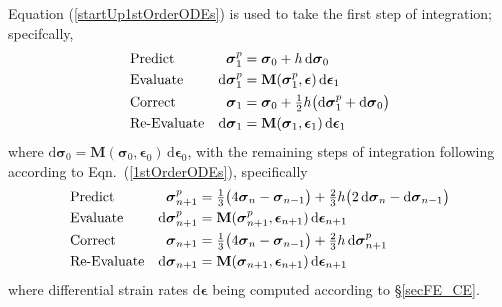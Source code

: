 Equation (\ref{startUp1stOrderODEs}) is used to take the first step of integration; specifcally, 
\begin{subequations}
    \notag
    \begin{align}
    \mbox{} & \text{Predict} & 
    \boldsymbol{\sigma}_1^p & = \boldsymbol{\sigma}_0 + h \, \mathrm{d} \boldsymbol{\sigma}_0 \\
    \mbox{} & \text{Evaluate} & 
    \mathrm{d} \boldsymbol{\sigma}^p_1 & = \mathbf{M} ( \boldsymbol{\sigma}_1^p ,
    \boldsymbol{\epsilon} ) \, \mathrm{d} \boldsymbol{\epsilon}_1 \\
    \mbox{} & \text{Correct} &
    \boldsymbol{\sigma}_1 & = \boldsymbol{\sigma}_0 + \tfrac{1}{2} h 
    \bigl( \mathrm{d} \boldsymbol{\sigma}_1^p + 
    \mathrm{d} \boldsymbol{\sigma}_0 \bigr) \\
    \mbox{} & \text{Re-Evaluate} & 
    \mathrm{d} \boldsymbol{\sigma}_1 & = \mathbf{M} ( \boldsymbol{\sigma}_1 , 
    \boldsymbol{\epsilon}_1) \, \mathrm{d} \boldsymbol{\epsilon}_1
    \end{align}
\end{subequations}
where $\mathrm{d} \boldsymbol{\sigma}_0 = \mathbf{M} ( \boldsymbol{\sigma}_0 , \boldsymbol{\epsilon}_0) \, \mathrm{d} \boldsymbol{\epsilon}_0$, with the remaining steps of integration following according to Eqn.~(\ref{1stOrderODEs}), specifically
\begin{subequations}
    \notag
    \begin{align}
    \mbox{} & \text{Predict} & 
    \boldsymbol{\sigma}_{n+1}^p & = \tfrac{1}{3} 
    \bigl( 4 \boldsymbol{\sigma}_n - \boldsymbol{\sigma}_{n-1} \bigr) + 
    \tfrac{2}{3} h \bigl( 2 \, \mathrm{d} \boldsymbol{\sigma}_n - 
    \mathrm{d} \boldsymbol{\sigma}_{n-1} \bigr) \\
    \mbox{} & \text{Evaluate} & 
    \mathrm{d} \boldsymbol{\sigma}^p_{n+1} & = \mathbf{M} ( \boldsymbol{\sigma}_{n+1}^p , \boldsymbol{\epsilon}_{n+1} ) \, 
    \mathrm{d} \boldsymbol{\epsilon}_{n+1} \\
    \mbox{} & \text{Correct} &
    \boldsymbol{\sigma}_{n+1} & = \tfrac{1}{3} 
    \bigl( 4 \boldsymbol{\sigma}_n - \boldsymbol{\sigma}_{n-1} \bigr) + 
    \tfrac{2}{3} h \, \mathrm{d} \boldsymbol{\sigma}^{p}_{n+1}  \\
    \mbox{} & \text{Re-Evaluate} & 
    \mathrm{d} \boldsymbol{\sigma}_{n+1} & = \mathbf{M} ( 
    \boldsymbol{\sigma}_{n+1} , \boldsymbol{\epsilon}_{n+1} )  \,
    \mathrm{d} \boldsymbol{\epsilon}_{n+1}
    \end{align}
\end{subequations} 
where differential strain rates $\mathrm{d} \boldsymbol{\epsilon}$ being computed according to \S\ref{secFE_CE}.


